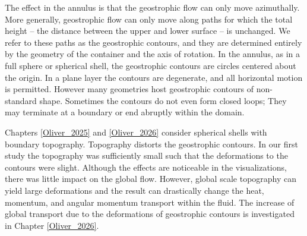 The effect in the annulus is that the geostrophic flow can only move azimuthally. 
More generally, geostrophic flow can only move along paths for which the total height -- the distance between the upper and lower surface -- is unchanged.
We refer to these paths as the geostrophic contours, and they are determined entirely by the geometry of the container and the axis of rotation.
In the annulus, as in a full sphere or spherical shell, the geostrophic contours are circles centered about the origin. In a plane layer the contours are degenerate, and all horizontal motion is permitted.
However many geometries host geostrophic contours of non-standard shape.
Sometimes the contours do not even form closed loops; They may terminate at a boundary or end abruptly within the domain. 

Chapters \ref{Oliver_2025} and \ref{Oliver_2026} consider spherical shells with boundary topography. 
Topography distorts the geostrophic contours. In our first study the topography was sufficiently small such that the deformations to the contours were slight. 
Although the effects are noticeable in the visualizations, there was little impact on the global flow. 
However, global scale topography can yield large deformations and the result can drastically change the heat, momentum, and angular momentum transport within the fluid. The increase of global transport due to the deformations of geostrophic contours is investigated in Chapter \ref{Oliver_2026}.

